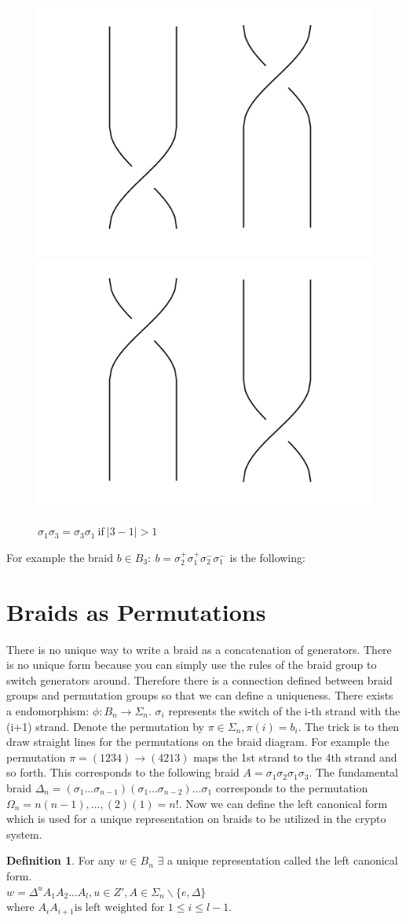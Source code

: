 \documentclass{article}
\theoremstyle{definition}
\newtheorem{definition}{Definition}[section]
\begin{document}
\begin{figure}[hbp!]
\centering
  \includegraphics[width=0.2\linewidth]{./Pictures/commute_1.png}
  \includegraphics[width=0.2\linewidth]{./Pictures/commute_2.png}
  \caption{$\sigma_1\sigma_3=\sigma_3\sigma_1\ \textrm{if}\ |3-1|>1$}\label{fig:graph}
\end{figure}

For example the braid $b \in B_3: \ b=\sigma_2^+ \sigma_1^+ \sigma_2^- \sigma_1^-$ is the following:
	
	\begin{figure}[hbp!]
\centering
\end{figure}
	
	
\section{Braids as Permutations}
	There is no unique way to write a braid as a concatenation of generators. There is no unique form because you can simply use the rules of the braid group to switch generators around. Therefore there is a connection defined between braid groups and permutation groups so that we can define a uniqueness. There exists a endomorphism:
	$ \phi: B_n \rightarrow \Sigma_n$.
	$\sigma_i $ represents the switch of the i-th strand with the (i+1) strand. 
	Denote the permutation by $\pi \in \Sigma_n, \pi(i)=b_i$. The trick is to then draw straight lines for the permutations on the braid diagram. For example the permutation $\pi=(1 2 3 4)\rightarrow(4 2 1 3)$ maps the 1st strand to the 4th strand and so forth. This corresponds to the following braid $A=\sigma_1 \sigma_2 \sigma_1 \sigma_3$. The fundamental braid $\Delta_n=(\sigma_1...\sigma_{n-1})(\sigma_1 ... \sigma_{n-2})...\sigma_1 $ corresponds to the permutation $\Omega_n=n(n-1),...,(2)(1)=n!$. Now we can define the left canonical form which is used for a unique representation on braids to be utilized in the crypto system.
	
	\begin{definition}	
	For any $w \in B_n$ $\exists$ a unique representation called the left canonical form.
	\\$w = \Delta^u A_1 A_2 ... A_l, u \in Z', A \in \Sigma_n \backslash \{ e, \Delta \} $
	$\text{where } A_i A_{i+1} \text{is left weighted for } 1 \leq i \leq l - 1.$
	\end{definition}
	
\end{document}
